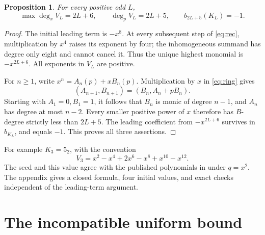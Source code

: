 \documentclass[11pt]{amsart}
\newtheorem{proposition}{Proposition}[section]
\theoremstyle{remark}
\newcommand{\degp}{\deg_p}
\begin{document}
\begin{proposition}\label{prop:degree}
For every positive odd \(L\),
\[
 \max\deg_x V_L=2L+6,\qquad
 \degp V_L=2L+5,\qquad b_{2L+5}(K_L)=-1.
\]
\end{proposition}
\begin{proof}
The initial leading term is \(-x^8\).
At every subsequent step of \eqref{eq:rec},
multiplication by \(x^4\) raises its exponent by four;
the inhomogeneous summand has degree only eight
and cannot cancel it. Thus the unique highest
monomial is \(-x^{2L+6}\).
All exponents in \(V_L\) are positive.

For \(n\ge1\), write \(x^n=A_n(p)+xB_n(p)\).
Multiplication by \(x\) in \eqref{eq:ring} gives
\[
 (A_{n+1},B_{n+1})=(B_n,A_n+pB_n).
\]
Starting with \(A_1=0,B_1=1\), it follows that
\(B_n\) is monic of degree \(n-1\), and \(A_n\)
has degree at most \(n-2\).
Every smaller positive power of \(x\) therefore
has \(B\)-degree strictly less than \(2L+5\).
The leading coefficient from \(-x^{2L+6}\)
survives in \(b_{K_L}\), and equals \(-1\).
This proves all three assertions.
\end{proof}

For example \(K_3=5_2\), with the convention
\[
 V_3=x^2-x^4+2x^6-x^8+x^{10}-x^{12}.
\]
The seed and this value agree with the published
polynomials in \cite[pp.~74, 79]{GZ} under \(q=x^2\).
The appendix gives a closed formula, four initial
values, and exact checks independent of the
leading-term argument.

\section{The incompatible uniform bound}\label{sec:package}
\end{document}
